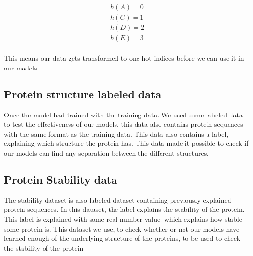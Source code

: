 \begin{align}
h(A) = 0 \\
h(C) = 1 \\
h(D) = 2 \\
h(E) = 3 \\
\end{align}

\noindent
This means our data gets transformed to one-hot indices before we can use it in our models.

\subsection{Protein structure labeled data}
Once the model had trained with the training data. We used some labeled data to test the effectiveness of our models. this data also contains protein sequences with the same format as the training data. This data also contains a label, explaining which structure the protein has. This data made it possible to check if our models can find any separation between the different structures.


\subsection{Protein Stability data}
The stability dataset is also labeled dataset containing previously explained protein sequences. In this dataset, the label explains the stability of the protein. This label is explained with some real number value, which explains how stable some protein is. This dataset we use, to check whether or not our models have learned enough of the underlying structure of the proteins, to be used to check the stability of the protein